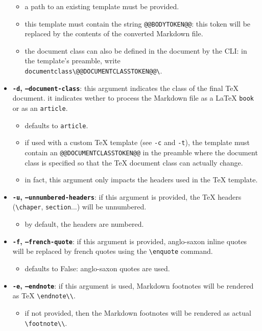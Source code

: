 \begin{itemize}
\begin{itemize}
\item a path to an existing template must be provided.
\item this template must contain the string \texttt{@@BODYTOKEN@@}: this token will be replaced by the contents of the 	 converted Markdown file.
\item the document class can also be defined in the document by the CLI: 	 in the template's preamble, write \texttt{documentclass\textbackslash{}{@@DOCUMENTCLASSTOKEN@@\textbackslash{}}}.
\end{itemize}
\item \textbf{\texttt{-d}, \texttt{--document-class}}: this argument indicates the class of the final TeX document. it indicates wether to process the Markdown file as a LaTeX \texttt{book} or as an \texttt{article}.
\begin{itemize} 
 \item defaults to \texttt{article}.
\item if used with a custom TeX template (see \texttt{-c} and \texttt{-t}), the template must contain an \texttt{@@DOCUMENTCLASSTOKEN@@} 	 in the preamble where the document class is specified so that the TeX document class can actually change.
\item in fact, this argument only impacts the headers used in the TeX template.
\end{itemize}
\item \textbf{\texttt{-u}, \texttt{--unnumbered-headers}}: if this argument is provided, the TeX headers (\texttt{\textbackslash{}chaper}, \texttt{section}...) will be unnumbered.
\begin{itemize} 
 \item by default, the headers are numbered.
\end{itemize}
\item \textbf{\texttt{-f}, \texttt{--french-quote}}: if this argument is provided, anglo-saxon inline quotes will be replaced by french quotes using the \texttt{\textbackslash{}enquote} command.
\begin{itemize} 
 \item defaults to False: anglo-saxon quotes are used.
\end{itemize}
\item \textbf{\texttt{-e}, \texttt{--endnote}}: if this argument is used, Markdown footnotes will be rendered as TeX \texttt{\textbackslash{}endnote\textbackslash{}{\textbackslash{}}}.
\begin{itemize} 
 \item if not provided, then the Markdown footnotes will be rendered as actual \texttt{\textbackslash{}footnote\textbackslash{}{\textbackslash{}}}. 
\end{itemize}
\end{itemize}
